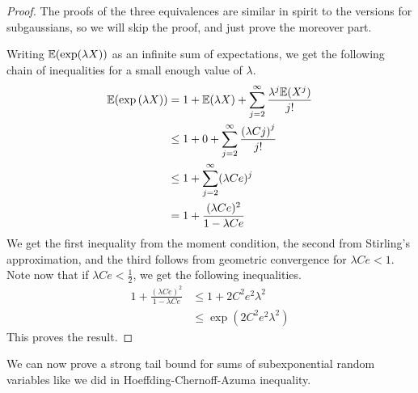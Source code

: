 \documentclass[11pt]{article}
\begin{document}
\begin{proof}
  The proofs of the three equivalences are similar in spirit to the versions for subgaussians, so we will skip the proof, and just prove the moreover part.

  Writing $\mathbb{E}(\exp(\lambda X))$ as an infinite sum of expectations, we get the following chain of inequalities for a small enough value of $\lambda$.
  \begin{align*}
    \mathbb{E}(\exp\left( \lambda X \right)) &= 1 + \mathbb{E}(\lambda X) + \sum_{j=2}^{\infty} \frac{\lambda^j \mathbb{E}(X^j)}{j!} \\
                                     &\leq 1 + 0 + \sum_{j=2}^{\infty} \frac{\left( \lambda C j \right)^j}{j!} \\
                                     &\leq 1 + \sum_{j=2}^{\infty} (\lambda C e)^j \\
                                     &= 1 + \frac{(\lambda C e)^2}{1 - \lambda C e}
  \end{align*}
  We get the first inequality from the moment condition, the second from Stirling's approximation, and the third follows from geometric convergence for $\lambda C e < 1$.
  Note now that if $\lambda C e < \frac{1}{2}$, we get the following inequalities.
  \begin{align*}
    1 + \frac{(\lambda C e)^2}{1 - \lambda C e} &\leq 1 + 2C^2e^2\lambda^2 \\
    &\leq \exp\left( 2C^2e^2 \lambda^2 \right)
  \end{align*}
  This proves the result.
\end{proof}

We can now prove a strong tail bound for sums of subexponential random variables like we did in Hoeffding-Chernoff-Azuma inequality.
\end{document}
